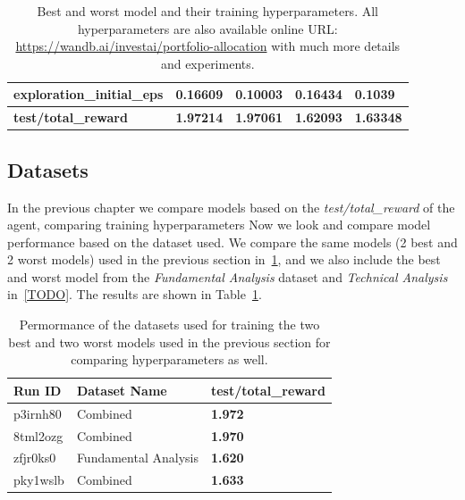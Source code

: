 \documentclass[../xlapes02]{subfiles}
\begin{document}
\begin{table}[!ht]
\begin{tabular}{|l||l|l||l|l|}
            \textbf{exploration\_initial\_eps} & 0.16609                                      & 0.10003                                      & 0.16434                                      & 0.1039                                       \\ \hline
            \textbf{test/total\_reward}        & \textcolor[RGB]{50,150,50}{\textbf{1.97214}} & \textcolor[RGB]{50,150,50}{\textbf{1.97061}} & \textcolor[RGB]{150,50,50}{\textbf{1.62093}} & \textcolor[RGB]{150,50,50}{\textbf{1.63348}} \\ \hline
        \end{tabular}
        \caption{Best and worst model and their training hyperparameters. All hyperparameters are also available online URL: \url{https://wandb.ai/investai/portfolio-allocation} with much more details and experiments.}
    \end{table}

    \subsection{Datasets}\label{subsec:datasets}
    In the previous chapter we compare models based on the \emph{test/total\_reward} of the agent, comparing training hyperparameters Now we look and compare model performance based on the dataset used. We compare the same models (2 best and 2 worst models) used in the previous section in~\cref{tab:best-worst-datasets}, and we also include the best and worst model from the \emph{Fundamental Analysis} dataset and \emph{Technical Analysis} in~\cref{TODO}. The results are shown in Table~\ref{tab:best-worst-datasets}.
    \begin{table}[!ht]
        \centering
        \label{tab:best-worst-datasets}
        \begin{tabular}{|l|l|l|}
            \hline
            \textbf{Run ID} & \textbf{Dataset Name} & \textbf{test/total\_reward}                \\ \hline
            p3irnh80        & Combined              & \textcolor[RGB]{50,150,50}{\textbf{1.972}} \\ \hline
            8tml2ozg        & Combined              & \textcolor[RGB]{50,150,50}{\textbf{1.970}} \\ \hline
            zfjr0ks0        & Fundamental Analysis  & \textcolor[RGB]{150,50,50}{\textbf{1.620}} \\ \hline
            pky1wslb        & Combined              & \textcolor[RGB]{150,50,50}{\textbf{1.633}} \\ \hline
        \end{tabular}
        \caption{Permormance of the datasets used for training the two best and two worst models used in the previous section for comparing hyperparameters as well.}
    \end{table}
\end{document}
